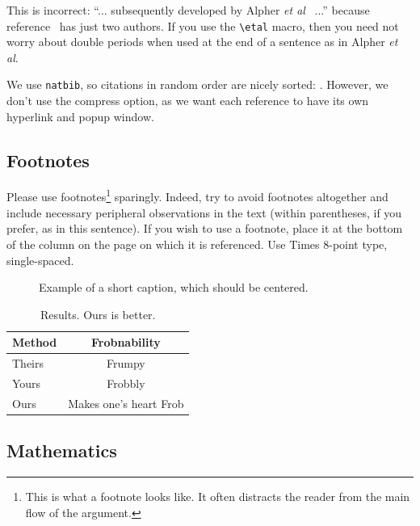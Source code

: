 \documentclass{bmvc2k}
\def\etal{\emph{et al}\bmvaOneDot}
\begin{document}
This is incorrect: ``... subsequently developed by Alpher \etal~\cite{Alpher03} ...''
because reference~\cite{Alpher03} has just two authors.  If you use the
\verb'\etal' macro, then you need not worry about double periods
when used at the end of a sentence as in Alpher \etal.

We use {\tt natbib}, so citations in random order are nicely sorted:
 \cite{Alpher03,Alpher02,Authors06b,Authors06}.  However, we don't use the
compress option, as we want each reference to have its own hyperlink and
popup window.

\subsection{Footnotes}

Please use footnotes\footnote {This is what a footnote looks like.  It
often distracts the reader from the main flow of the argument.} sparingly.
Indeed, try to avoid footnotes altogether and include necessary peripheral
observations in 
the text (within parentheses, if you prefer, as in this sentence).  If you
wish to use a footnote, place it at the bottom of the column on the page on
which it is referenced. Use Times 8-point type, single-spaced.


\begin{figure}
\begin{center}
\fbox{\rule{0pt}{2in} \rule{.9\linewidth}{0pt}}
\end{center}
   \caption{Example of a short caption, which should be centered.}
\label{fig:short}
\end{figure}

\begin{table}
\begin{center}
\begin{tabular}{|l|c|}
\hline
Method & Frobnability \\
\hline\hline
Theirs & Frumpy \\
Yours & Frobbly \\
Ours & Makes one's heart Frob\\
\hline
\end{tabular}
\end{center}
\caption{Results.   Ours is better.}
\end{table}

\subsection{Mathematics}
\end{document}
